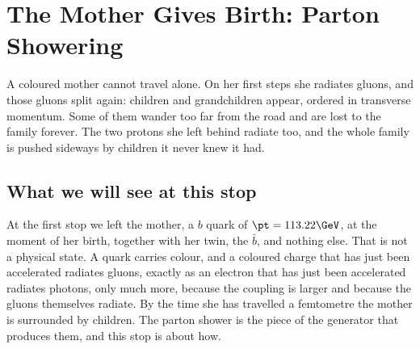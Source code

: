 \providecommand{\ptevol}{\ensuremath{p_{\mathrm{T,evol}}}\xspace}
\providecommand{\ptrad}{\ensuremath{p_{\mathrm{T,rad}}}\xspace}
\chapter{The Mother Gives Birth: Parton Showering}
\label{ch:mother_gives_birth}

\begin{journeybox}
A coloured mother cannot travel alone. On her first steps she radiates gluons,
and those gluons split again: children and grandchildren appear, ordered in
transverse momentum. Some of them wander too far from the road and are lost
to the family forever. The two protons she left behind radiate too, and the
whole family is pushed sideways by children it never knew it had.
\end{journeybox}


\section{What we will see at this stop}
\label{sec:mother_gives_birth:what_we_compute}

At the first stop we left the mother, a $b$ quark of $\pt=113.22\GeV$, at the
moment of her birth, together with her twin, the $\bar b$, and nothing else.
That is not a physical state. A quark carries colour, and a coloured charge
that has just been accelerated radiates gluons, exactly as an electron that
has just been accelerated radiates photons, only much more, because the
coupling is larger and because the gluons themselves radiate. By the time she
has travelled a femtometre the mother is surrounded by children. The parton
shower is the piece of the generator that produces them, and this stop is
about how.

